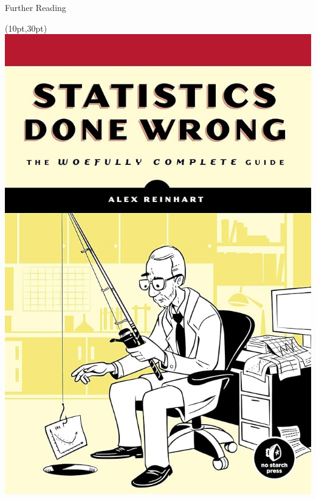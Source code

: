 \documentclass{beamer}
\begin{document}
\begin{frame}{Further Reading}
	\begin{textblock*}{60pt}(10pt,30pt)
		\includegraphics[width=1\textwidth]{../images/statsdonewrong.jpg}
	\end{textblock*}


\end{frame}
\end{document}
